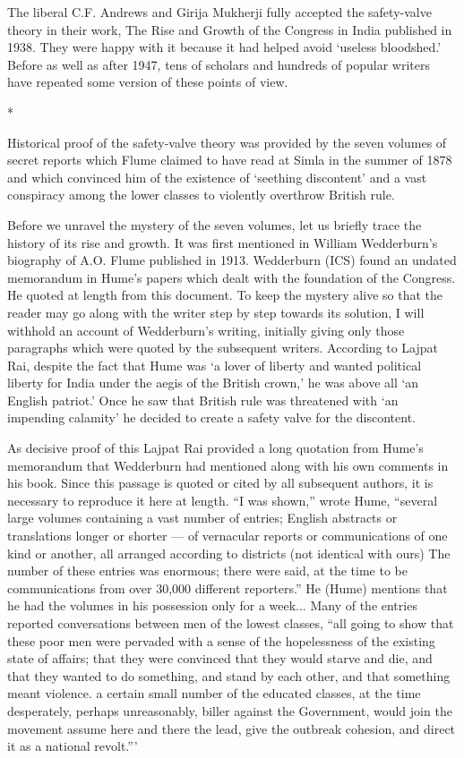 The liberal C.F. Andrews and Girija Mukherji fully accepted the safety-valve theory in their work, The Rise and Growth of the Congress in India published in 1938. They were happy with it because it had helped avoid ‘useless bloodshed.’ Before as well as after 1947, tens of scholars and hundreds of popular writers have repeated some version of these points of view.

\begin{center}*\end{center}

Historical proof of the safety-valve theory was provided by the seven volumes of secret reports which Flume claimed to have read at Simla in the summer of 1878 and which convinced him of the existence of ‘seething discontent’ and a vast conspiracy among the lower classes to violently overthrow British rule.

Before we unravel the mystery of the seven volumes, let us briefly trace the history of its rise and growth. It was first mentioned in William Wedderburn’s biography of A.O. Flume published in 1913. Wedderburn (ICS) found an undated memorandum in Hume’s papers which dealt with the foundation of the Congress. He quoted at length from this document. To keep the mystery alive so that the reader may go along with the writer step by step towards its solution, I will withhold an account of Wedderburn’s writing, initially giving only those paragraphs which were quoted by the subsequent writers. According to Lajpat Rai, despite the fact that Hume was ‘a lover of liberty and wanted political liberty for India under the aegis of the British crown,’ he was above all ‘an English patriot.’ Once he saw that British rule was threatened with ‘an impending calamity’ he decided to create a safety valve for the discontent.

As decisive proof of this Lajpat Rai provided a long quotation from Hume’s memorandum that Wedderburn had mentioned along with his own comments in his book. Since this passage is quoted or cited by all subsequent authors, it is necessary to reproduce it here at length. “I was shown,” wrote Hume, “several large volumes containing a vast number of entries; English abstracts or translations longer or shorter — of vernacular reports or communications of one kind or another, all arranged according to districts (not identical with ours) The number of these entries was enormous; there were said, at the time to be communications from over 30,000 different reporters.” He (Hume) mentions that he had the volumes in his possession only for a week... Many of the entries reported conversations between men of the lowest classes, “all going to show that these poor men were pervaded with a sense of the hopelessness of the existing state of affairs; that they were convinced that they would starve and die, and that they wanted to do something, and stand by each other, and that something meant violence. a certain small number of the educated classes, at the time desperately, perhaps unreasonably, biller against the Government, would join the movement assume here and there the lead, give the outbreak cohesion, and direct it as a national revolt.”’

